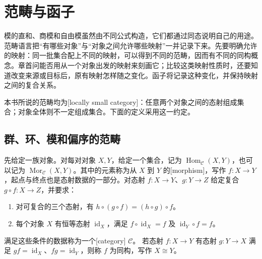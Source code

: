 
\section{范畴与函子}
\label{b2:sec:0501}

模的直和、商模和自由模虽然由不同公式构造，它们都通过同态说明自己的用途。范畴语言把“有哪些对象”与“对象之间允许哪些映射”一并记录下来。先要明确允许的映射：同一批集合配上不同的映射，可以得到不同的范畴，因而有不同的同构概念。章首问能否用从一个对象出发的映射来刻画它；比较这类映射性质时，还要知道改变来源或目标后，原有映射怎样随之变化。函子将记录这种变化，并保持映射之间的复合关系。

\ProseParagraphBreak
本书所说的范畴均为[locally small category]：任意两个对象之间的态射组成集合；对象全体则不一定组成集合。下面的定义采用这一约定。

%
%

\subsection{群、环、模和偏序的范畴}
\label{b2:subsec:0501:01}

\begin{definition}\label{b2:def:category}
	先给定一族对象。对每对对象 \(X,Y\)，给定一个集合，记为 \(\operatorname{Hom}_{\mathcal C}(X,Y)\)，也可以记为 \(\operatorname{Mor}_{\mathcal C}(X,Y)\)。其中的元素称为从 \(X\) 到 \(Y\) 的[morphism]，写作 \(f:X\rightarrow Y\)，起点与终点也是态射数据的一部分。对态射 \(f:X\rightarrow Y\)、\(g:Y\rightarrow Z\) 给定复合 \(g\circ f:X\rightarrow Z\)，并要求：
	\begin{enumerate}
		\item 对可复合的三个态射，有 \(h\circ(g\circ f)=(h\circ g)\circ f\)。
		\item 每个对象 \(X\) 有恒等态射 \(\operatorname{id}_X\)，满足 \(f\circ\operatorname{id}_X=f\) 及 \(\operatorname{id}_Y\circ f=f\)。
	\end{enumerate}
	满足这些条件的数据称为一个[category] \(\mathcal C\)。 若态射 \(f:X\rightarrow Y\) 有态射 \(g:Y\rightarrow X\) 满足 \(gf=\operatorname{id}_X\)、\(fg=\operatorname{id}_Y\)，则称 \(f\) 为同构，写作 \(X\cong Y\)。
\end{definition}

